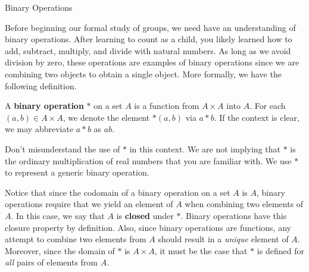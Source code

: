 \begin{section}{Binary Operations}


Before beginning our formal study of groups, we need have an understanding of binary operations. After learning to count as a child, you likely learned how to add, subtract, multiply, and divide with natural numbers.  As long as we avoid division by zero, these operations are examples of binary operations since we are combining two objects to obtain a single object.  More formally, we have the following definition.

\begin{definition}
A \textbf{binary operation} $*$ on a set $A$ is a function from $A\times A$ into $A$.  For each $(a,b)\in A\times A$, we denote the element $*(a,b)$ via $a*b$.  If the context is clear, we may abbreviate $a*b$ as $ab$.
\end{definition}

Don't misunderstand the use of $*$ in this context.  We are not implying that $*$ is the ordinary multiplication of real numbers that you are familiar with.  We use $*$ to represent a generic binary operation.  

Notice that since the codomain of a binary operation on a set $A$ is $A$, binary operations require that we yield an element of $A$ when combining two elements of $A$.  In this case, we say that $A$ is \textbf{closed} under $*$.  Binary operations have this closure property by definition.  Also, since binary operations are functions, any attempt to combine two elements from $A$ should result in a \emph{unique} element of $A$.  Moreover, since the domain of $*$ is $A\times A$, it must be the case that $*$ is defined for \emph{all} pairs of elements from $A$.


\end{section}
